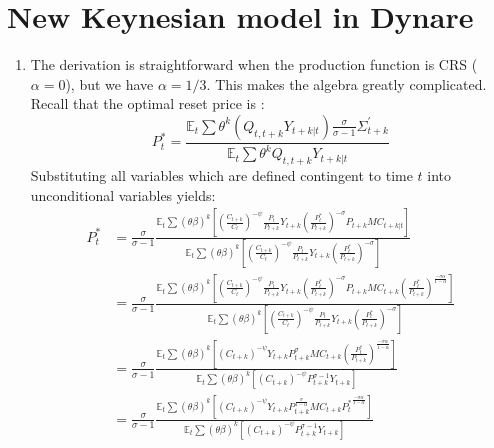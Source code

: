 \documentclass[11pt]{amsart}
\begin{document}
\section{New Keynesian model in Dynare}
\begin{enumerate}[label = (\alph*)]
	\item The derivation is straightforward when the production function is CRS ($\alpha = 0$), but we have $\alpha = 1/3$. This makes the algebra greatly complicated. Recall that the optimal reset price is :
	\begin{equation*}
	P _ { t } ^ { * } = \frac { \mathbb { E } _ { t } \sum \theta ^ { k } \left( Q _ { t ,t + k } Y _ { t + k | t } \right) \frac { \sigma } { \sigma - 1} \Sigma _ { t + k } ^ { \prime } } { \mathbb { E } _ { t } \sum \theta ^ { k } Q _ { t ,t + k } Y _ { t + k | t } }
	\end{equation*}
	Substituting all variables which are defined contingent to time $t$ into unconditional variables yields:
	\begin{align*}
	P_t^* &=  \frac{\sigma}{\sigma - 1}\frac{\mathbb{ E }_t \sum (\theta \beta)^k \left[ \left( \frac{C_{t+k}}{C_t}\right)^{-\psi} \frac{P_t}{P_{t+k}} Y_{t+k} \left( \frac{P_t^*}{P_{t+k}}\right)^{-\sigma}   P_{t+k} MC_{t+k|t} \right]} {\mathbb{ E }_t \sum (\theta \beta)^k  \left[ \left( \frac{C_{t+k}}{C_t}\right)^{-\psi} \frac{P_t}{P_{t+k}} Y_{t+k} \left( \frac{P_t^*}{P_{t+k}}\right)^{-\sigma} \right]} \\
	& = \frac{\sigma}{\sigma - 1}\frac{\mathbb{ E }_t \sum (\theta \beta)^k \left[ \left( \frac{C_{t+k}}{C_t}\right)^{-\psi} \frac{P_t}{P_{t+k}} Y_{t+k} \left( \frac{P_t^*}{P_{t+k}}\right)^{-\sigma}   P_{t+k} MC_{t+k} \left(  \frac{P_t^*}{P_{t+k}}\right)^{\frac{-\sigma \alpha}{1-\alpha}} \right]} {\mathbb{ E }_t \sum (\theta \beta)^k  \left[ \left( \frac{C_{t+k}}{C_t}\right)^{-\psi} \frac{P_t}{P_{t+k}} Y_{t+k} \left( \frac{P_t^*}{P_{t+k}}\right)^{-\sigma} \right]} \\
	& = \frac{\sigma}{\sigma - 1}\frac{\mathbb{ E }_t \sum (\theta \beta)^k \left[ \left( C_{t+k}\right)^{-\psi}  Y_{t+k} P_{t+k}^\sigma    MC_{t+k} \left(  \frac{P_t^*}{P_{t+k}}\right)^{\frac{-\sigma \alpha}{1-\alpha}} \right]} {\mathbb{ E }_t \sum (\theta \beta)^k  \left[ \left( C_{t+k}\right)^{-\psi} P_{t+k}^{\sigma-1} Y_{t+k}  \right]} \\
	& = \frac{\sigma}{\sigma - 1}\frac{\mathbb{ E }_t \sum (\theta \beta)^k \left[ \left( C_{t+k}\right)^{-\psi}  Y_{t+k} P_{t+k}^{\frac{\sigma}{1-\alpha}}    MC_{t+k}  {P_t^*}^{\frac{-\sigma \alpha}{1-\alpha}} \right]} {\mathbb{ E }_t \sum (\theta \beta)^k  \left[ \left( C_{t+k}\right)^{-\psi} P_{t+k}^{\sigma-1} Y_{t+k}  \right]} \\ 

\end{align*}
\end{enumerate}
\end{document}
